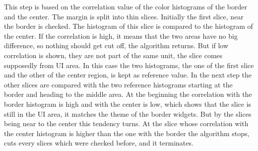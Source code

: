\documentclass[draft,final]{vutinfth} %
\begin{document}
	This step is based on the correlation value of the color histograms of the border and the center.
	The margin is split into thin slices.
	Initially the first slice, near the border is checked.
	The histogram of this slice is compared to the histogram of the center.
	If the correlation is high, it means that the two areas have no big difference, so nothing should get cut off, the algorithm returns.
	But if low correlation is shown, they are not part of the same unit, the slice comes supposedly from UI area.
	In this case the two histograms, the one of the first slice and the other of the center region, is kept as reference value.
	In the next step the other slices are compared with the two reference histograms starting at the border and heading to the middle area.
	At the beginning the correlation with the border histogram is high and with the center is low, which shows that the slice is still in the UI area, it matches the theme of the border widgets.
	But by the slices being near to the center this tendency turns.
	At the slice whose correlation with the center histogram is higher than the one with the border the algorithm stops, cuts every slices which were checked before, and it terminates.\par 
	
\end{document}
